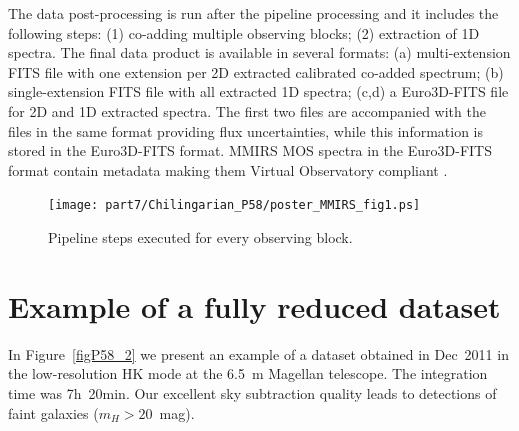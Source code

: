 The data post-processing is run after the pipeline processing and it
includes the following steps: (1) co-adding multiple observing blocks; (2)
extraction of 1D spectra.  The final data product is available in several
formats: (a) multi-extension FITS file with one extension per 2D extracted
calibrated co-added spectrum; (b) single-extension FITS file with all
extracted 1D spectra; (c,d) a Euro3D-FITS file for 2D and 1D extracted
spectra.  The first two files are accompanied with the files in the same
format providing flux uncertainties, while this information is stored in the
Euro3D-FITS format.  MMIRS MOS spectra in the Euro3D-FITS format contain
metadata making them Virtual Observatory compliant
\citep{CBLM06,Chilingarian+08b}.

\begin{figure}
\texttt{[image: part7/Chilingarian\_P58/poster\_MMIRS\_fig1.ps]}
\caption{Pipeline steps executed for every observing block.\label{figP58_1}}
\end{figure}

\section{Example of a fully reduced dataset}

In Figure~\ref{figP58_2} we present an example of a dataset obtained in
Dec~2011 in the low-resolution HK mode at the 6.5~m Magellan telescope. The
integration time was 7h~20min. Our excellent sky subtraction quality
leads to detections of faint galaxies ($m_H>20$~mag).


